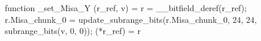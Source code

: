 function _set_Misa_Y (r_ref, v) = {
    r = __bitfield_deref(r_ref);
    r.Misa_chunk_0 = update_subrange_bits(r.Misa_chunk_0, 24, 24, subrange_bits(v, 0, 0));
    (*r_ref) = r
}
